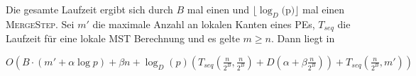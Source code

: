 Die gesamte Laufzeit ergibt sich durch $B$ mal einen \boruvkaStep und $\lfloor \log_{D}($p$) \rfloor$ mal einen \textsc{MergeStep}. 
Sei $m'$ die maximale Anzahl an lokalen Kanten eines PEs, $T_{seq}$ die Laufzeit für eine lokale MST Berechnung und es gelte $m \geq n$.
Dann liegt \boruvkaThenMerge in 
\begin{center}
$O(B \cdot (m' + \alpha \log p) + \beta n
+ \log_{D}(p)  (T_{seq}(\frac{n}{2^B},\frac{n}{2^B}) + D(\alpha + \beta \frac{n}{2^B}))
+ T_{seq}(\frac{n}{2^B},m')
)$
\end{center}
